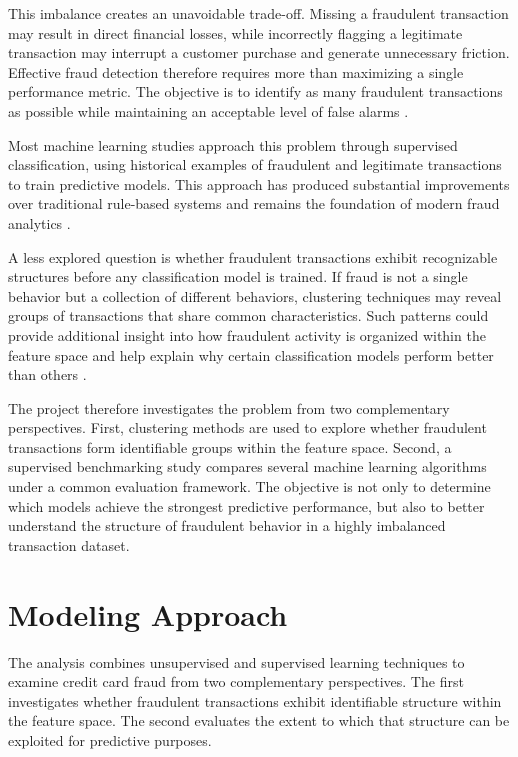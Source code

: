 \documentclass[
  12pt,
  letterpaper,
]{book}
\begin{document}
This imbalance creates an unavoidable trade-off. Missing a fraudulent
transaction may result in direct financial losses, while incorrectly
flagging a legitimate transaction may interrupt a customer purchase and
generate unnecessary friction. Effective fraud detection therefore
requires more than maximizing a single performance metric. The objective
is to identify as many fraudulent transactions as possible while
maintaining an acceptable level of false alarms
.

Most machine learning studies approach this problem through supervised
classification, using historical examples of fraudulent and legitimate
transactions to train predictive models. This approach has produced
substantial improvements over traditional rule-based systems and remains
the foundation of modern fraud analytics
.

A less explored question is whether fraudulent transactions exhibit
recognizable structures before any classification model is trained. If
fraud is not a single behavior but a collection of different behaviors,
clustering techniques may reveal groups of transactions that share
common characteristics. Such patterns could provide additional insight
into how fraudulent activity is organized within the feature space and
help explain why certain classification models perform better than
others .

The project therefore investigates the problem from two complementary
perspectives. First, clustering methods are used to explore whether
fraudulent transactions form identifiable groups within the feature
space. Second, a supervised benchmarking study compares several machine
learning algorithms under a common evaluation framework. The objective
is not only to determine which models achieve the strongest predictive
performance, but also to better understand the structure of fraudulent
behavior in a highly imbalanced transaction dataset.

\section{Modeling Approach}\label{modeling-approach-3}

The analysis combines unsupervised and supervised learning techniques to
examine credit card fraud from two complementary perspectives. The first
investigates whether fraudulent transactions exhibit identifiable
structure within the feature space. The second evaluates the extent to
which that structure can be exploited for predictive purposes.
\end{document}
